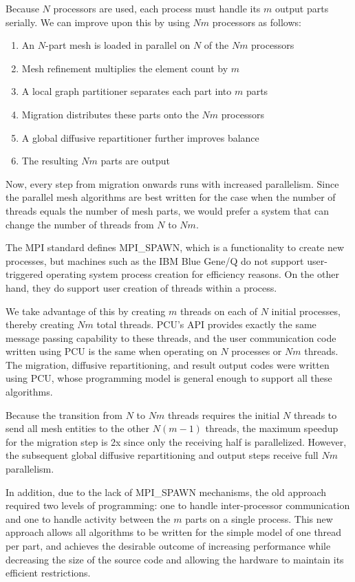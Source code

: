 \documentclass[final,1p,times]{elsarticle}
\begin{document}
Because $N$ processors are used, each process must handle its
$m$ output parts serially.
We can improve upon this by using $Nm$ processors as follows:

\begin{enumerate}
\item An $N$-part mesh is loaded in parallel on $N$ of the $Nm$ processors
\item Mesh refinement multiplies the element count by $m$
\item A local graph partitioner separates each part into $m$ parts
\item Migration distributes these parts onto the $Nm$ processors
\item A global diffusive repartitioner further improves balance
\item The resulting $Nm$ parts are output
\end{enumerate}

Now, every step from migration onwards runs with increased parallelism.
Since the parallel mesh algorithms are best written for the case when
the number of threads equals the number of mesh parts, we would prefer
a system that can change the number of threads from $N$ to $Nm$.

The MPI standard defines MPI\_SPAWN, which is a functionality to create
new processes, but machines such as the IBM Blue Gene/Q do not support
user-triggered operating system process creation for efficiency reasons.
On the other hand, they do support user creation of threads within a
process.

We take advantage of this by creating $m$ threads on each of $N$ initial
processes, thereby creating $Nm$ total threads.
PCU's API provides exactly the same message passing capability to these
threads, and the user communication code written using PCU is the same when
operating on $N$ processes or $Nm$ threads.
The migration, diffusive repartitioning, and result output codes were
written using PCU, whose programming model is general enough to support
all these algorithms.

Because the transition from $N$ to $Nm$ threads requires the initial
$N$ threads to send all mesh entities to the other $N(m-1)$ threads,
the maximum speedup for the migration step is 2x since only the
receiving half is parallelized.
However, the subsequent global diffusive repartitioning and 
output steps receive full $Nm$ parallelism.

In addition, due to the lack of MPI\_SPAWN mechanisms, the old approach
required two levels of programming: one to handle inter-processor
communication and one to handle activity between the $m$ parts on
a single process.
This new approach allows all algorithms to be written for the simple
model of one thread per part, and achieves the desirable outcome of increasing
performance while decreasing the size of the source code and
allowing the hardware to maintain its efficient restrictions.
\end{document}
